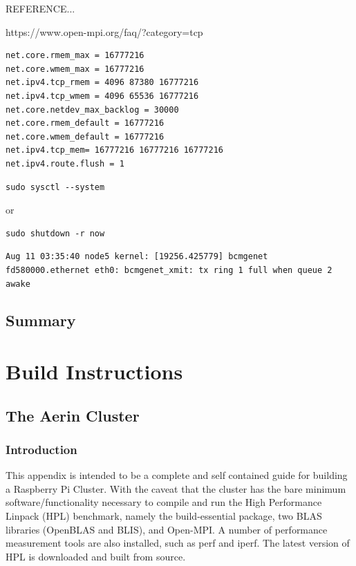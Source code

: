 \documentclass{report}
\begin{document}
REFERENCE...

https://www.open-mpi.org/faq/?category=tcp

\lstset{style=listingstyle}
\begin{lstlisting}[caption=/etc/sysctl.d/picluster.conf]
net.core.rmem_max = 16777216
net.core.wmem_max = 16777216
net.ipv4.tcp_rmem = 4096 87380 16777216
net.ipv4.tcp_wmem = 4096 65536 16777216
net.core.netdev_max_backlog = 30000
net.core.rmem_default = 16777216
net.core.wmem_default = 16777216
net.ipv4.tcp_mem= 16777216 16777216 16777216
net.ipv4.route.flush = 1
\end{lstlisting}


\lstset{style=termstyle}
\begin{lstlisting}
sudo sysctl --system
\end{lstlisting}

or

\lstset{style=termstyle}
\begin{lstlisting}
sudo shutdown -r now
\end{lstlisting}




\lstset{style=termstyle}
\begin{lstlisting}
Aug 11 03:35:40 node5 kernel: [19256.425779] bcmgenet fd580000.ethernet eth0: bcmgenet_xmit: tx ring 1 full when queue 2 awake
\end{lstlisting}


%
%
\chapter{Summary}


%
%
\part{Build Instructions}

%
%
\chapter{The Aerin Cluster}

\section{Introduction}

This appendix is intended to be a complete and self contained guide for building a Raspberry Pi Cluster. With the caveat that the cluster has the bare minimum software/functionality necessary to compile and run the High Performance Linpack (HPL) benchmark, namely the build-essential package, two BLAS libraries (OpenBLAS and BLIS), and Open-MPI. A number of performance measurement tools are also installed, such as perf and iperf. The latest version of HPL is downloaded and built from source.
\end{document}

